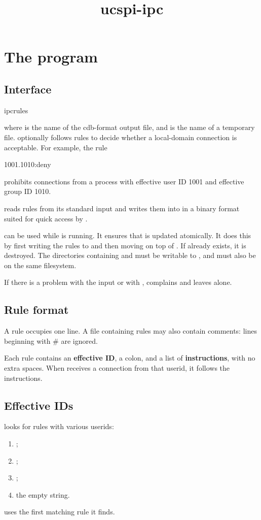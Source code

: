 \documentclass{book}
\title{ucspi-ipc}
\begin{document}
\section{The  program}

\subsection{Interface}
\begin{code}%
  ipcrules  
\end{code}
where  is the name of the cdb-format output file, and
 is the name of a temporary file.
 optionally follows rules to decide whether a
local-domain connection is acceptable.  For example, the rule
\begin{code}%
  1001.1010:deny
\end{code}
prohibits connections from a process with effective user ID 1001 and
effective group ID 1010.

 reads rules from its standard input and writes them
into  in a binary format suited for quick access by
.

 can be used while  is running.  It
ensures that  is updated atomically.  It does this by first
writing the rules to  and then moving  on top of
.  If  already exists, it is destroyed.  The
directories containing  and  must be writable to
, and must also be on the same filesystem.

If there is a problem with the input or with , 
complains and leaves  alone.

\subsection{Rule format}
A rule occupies one line.  A file containing rules may also contain
comments: lines beginning with \# are ignored.

Each rule contains an \textbf{effective ID}, a colon, and a list of
\textbf{instructions}, with no extra spaces.  When 
receives a connection from that userid, it follows the instructions.

\subsection{Effective IDs}
 looks for rules with various userids:
\begin{enumerate}
\item {};
\item {};
\item {};
\item the empty string.
\end{enumerate}
 uses the first matching rule it finds.
\end{document}
